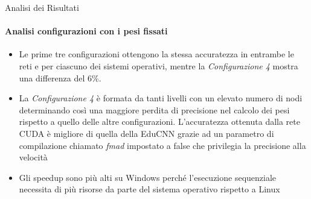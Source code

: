 \documentclass[
 ]{beamer}
\begin{document}

\begin{frame}{Analisi dei Risultati}
    \framesubtitle{Analisi configurazioni con i pesi fissati}
    \smallskip
    \begin{itemize} [<+->]
        \setlength\itemsep{1em}
        \item \large Le prime tre configurazioni ottengono la stessa accuratezza in entrambe le reti e per ciascuno dei sistemi operativi, mentre la \emph{Configurazione 4} mostra una differenza del 6\%. 
        \item \large La \emph{Configurazione 4} è formata da tanti livelli con un elevato numero di nodi determinando così una maggiore perdita di precisione nel calcolo dei pesi rispetto a quello delle altre configurazioni. L'accuratezza ottenuta dalla rete CUDA è migliore di quella della EduCNN grazie ad un parametro di compilazione chiamato \emph{fmad} impostato a false che privilegia la precisione alla velocità
        \item \large Gli speedup sono più alti su Windows perché l'esecuzione sequenziale necessita di più risorse da parte del sistema operativo rispetto a Linux
    \end{itemize}     
\end{frame}
\end{document}
